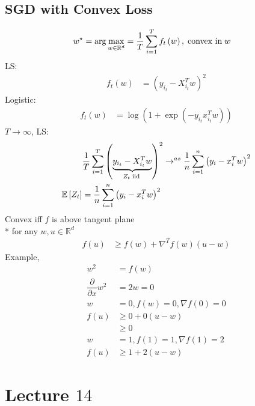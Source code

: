 \documentclass{article}
\begin{document}
\subsection{SGD with Convex Loss}
\begin{align*}
w^\star  &= \arg\displaystyle\max_{w \in \mathbb{R}^{d}} = \dfrac{1}{T} \displaystyle\sum_{i=1}^{T} f_{t}\left(w\right), \text{\;convex in\;} w 
\end{align*}
LS:
\begin{align*}
f_{t}\left(w\right) &= \left(y_{i_{t}} - X_{i_{t}}^{T} w\right)^{2}
\end{align*}
Logistic:
\begin{align*}
f_{t}\left(w\right) &= \log\left(1 + \exp\left(-y_{i_{t}} x_{i_{t}}^{T} w\right)\right)
\end{align*}
$T  \to  \infty$, LS:
\begin{align*}
&\dfrac{1}{T} \displaystyle\sum_{i=1}^{T} \left(\underbrace{y_{i_{t}} - X_{i_{t}}^{T} w}_{Z_{t} \text{\;iid\;}}\right)^{2} \to ^{as} \dfrac{1}{n} \displaystyle\sum_{i=1}^{n} \left(y_{i} - x_{i}^{T} w\right)^{2}
\\ \mathbb{E}\left[Z_{t}\right] &= \dfrac{1}{n} \displaystyle\sum_{i=1}^{n} \left(y_{i} - x_{i}^{T} w\right)^{2}
\end{align*}
Convex iff $f $ is above tangent plane
\\* for any $w , u \in \mathbb{R}^{d}$
\begin{align*}
f\left(u\right)  &\geq  f\left(w\right) + \nabla ^{T} f\left(w\right)\left(u - w \right)
\end{align*}
Example,
\begin{align*}
w^{2} &= f\left(w\right)
\\ \dfrac{\partial }{\partial x} w^{2} &= 2 w = 0
\\ w  &= 0, f\left(w\right) = 0, \nabla  f\left(0\right) = 0
\\ f\left(u\right)  &\geq  0 + 0 \left(u - w \right)
\\ &\geq  0
\\ w  &= 1, f\left(1\right) = 1, \nabla  f\left(1\right) = 2
\\ f\left(u\right)  &\geq  1 + 2 \left(u - w \right)
\end{align*}





\section{Lecture $14$} 
\end{document}
